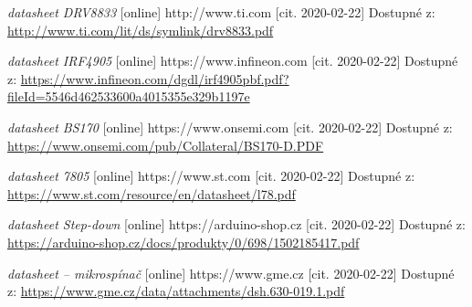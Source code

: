 \documentclass{template/socthesis}
\begin{document}
\begin{thebibliography}{12}
			
			\textit{datasheet DRV8833} [online] http://www.ti.com [cit. 2020-02-22] Dostupné z:
			\url{http://www.ti.com/lit/ds/symlink/drv8833.pdf}
			
			
			\textit{datasheet IRF4905} [online] https://www.infineon.com [cit. 2020-02-22] Dostupné z:
			\url{https://www.infineon.com/dgdl/irf4905pbf.pdf?fileId=5546d462533600a4015355e329b1197e}
			
			
			\textit{datasheet BS170} [online] https://www.onsemi.com [cit. 2020-02-22] Dostupné z:
			\url{https://www.onsemi.com/pub/Collateral/BS170-D.PDF}
			
			
			\textit{datasheet 7805} [online] https://www.st.com [cit. 2020-02-22] Dostupné z:
			\url{https://www.st.com/resource/en/datasheet/l78.pdf}
			
			
			\textit{datasheet Step-down} [online] https://arduino-shop.cz [cit. 2020-02-22] Dostupné z:
			\url{https://arduino-shop.cz/docs/produkty/0/698/1502185417.pdf}
			
			
			\textit{datasheet -- mikrospínač} [online] https://www.gme.cz [cit. 2020-02-22] Dostupné z:
			\url{https://www.gme.cz/data/attachments/dsh.630-019.1.pdf}
			

\end{thebibliography}
\end{document}
